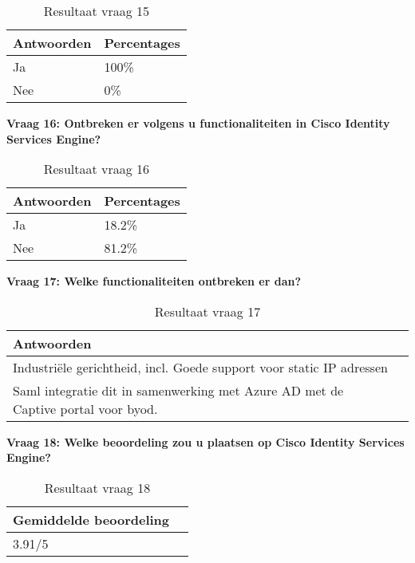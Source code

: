 \begin{table}[H]
	\begin{center}
		\begin{tabular}{|l|l|}
			\hline
\bf Antwoorden    & \bf Percentages \\ \hline
Ja      & 100\% \\ \hline
Nee     & 0\%    \\ \hline                                                                                                                                 
		\end{tabular}
		\caption{Resultaat vraag 15}
	\end{center}
\end{table}

\textbf{Vraag 16: Ontbreken er volgens u functionaliteiten in Cisco Identity Services Engine?}

\begin{table}[H]
	\begin{center}
		\begin{tabular}{|l|l|}
		\hline
		\bf Antwoorden    & \bf Percentages \\ \hline
		Ja      & 18.2\% \\ \hline
		Nee     & 81.2\%    \\ \hline                                                         
		\end{tabular}
		\caption{Resultaat vraag 16}
	\end{center}
\end{table}

\textbf{Vraag 17: Welke functionaliteiten ontbreken er dan?}

\begin{table}[H]
	\begin{center}
		\begin{tabular}{|l|l|}
			\hline
		\bf Antwoorden                                                                        \\ \hline
		Industriële gerichtheid, incl. Goede support voor static IP adressen              \\ \hline
		Saml integratie dit in samenwerking met Azure AD met de Captive portal voor byod. \\ \hline                                                      
		\end{tabular}
		\caption{Resultaat vraag 17}
	\end{center}
\end{table}

\textbf{Vraag 18: Welke beoordeling zou u plaatsen op Cisco Identity Services Engine?}
\begin{table}[H]
	\begin{center}
		\begin{tabular}{|l|l|}
			\hline
			\bf Gemiddelde beoordeling                                                                        \\ \hline
			3.91/5 \\ \hline                                                   
		\end{tabular}
		\caption{Resultaat vraag 18}
	\end{center}
\end{table}

